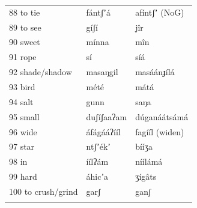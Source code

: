 \documentclass[output=paper]{langsci/langscibook}
\begin{document}
\begin{longtable}{p{}  p{} p{}}
88 to tie & f\'{a}ntʃʼ\'{a} & af\'{i}ntʃʼ (NoG) \\

89 to see & g\'{i}ʃ\'{i} & j\^{i}r \\

90 sweet & m\'{i}nna & m\^{i}n \\

91 rope & s\'{i} & s\'{i}\'{a} \\

92 shade/shadow & masaŋgil & mas\'{a}\'{a}nɟ\'{i}l\'{a} \\

93 bird & m\'{e}t\'{e} & m\'{a}t\'{a} \\

94 salt & gunn & saŋa \\

95 small & duʃ\'{i}ʃaaʔam & d\'{u}gan\'{a}\'{a}ts\'{a}m\'{a}
\\

96 wide & \'{a}f\'{a}g\'{a}\'{a}ʔ\'{i}\'{i}l & fag\'{i}\'{i}l (widen) \\

97 star & ntʃʼ\'{e}kʼ & b\'{i}\'{i}ʒa \\

98 in & \'{i}\'{i}lʔ\'{a}m & n\'{i}\'{i}l\'{a}m\'{a} \\

99 hard & \'{a}hicʼa & ʒ\'{i}g\^{a}ts \\

100 to crush/grind & garʃ & ganʃ \\
\lspbottomrule
\end{longtable}


\printbibliography[heading=subbibliography,notkeyword=this]
\end{document}
